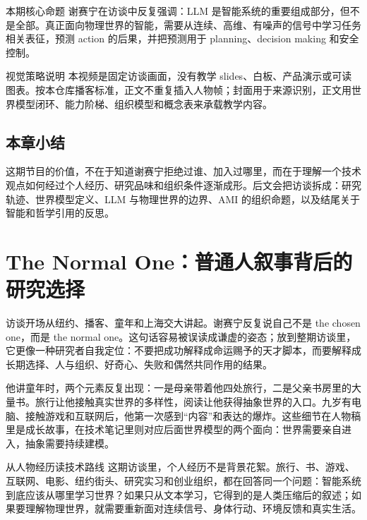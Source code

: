 \documentclass[a4paper]{article}
\begin{document}
\begin{importantbox}{本期核心命题}
谢赛宁在访谈中反复强调：LLM 是智能系统的重要组成部分，但不是全部。真正面向物理世界的智能，需要从连续、高维、有噪声的信号中学习任务相关表征，预测 action 的后果，并把预测用于 planning、decision making 和安全控制。
\end{importantbox}

\begin{knowledgebox}{视觉策略说明}
本视频是固定访谈画面，没有教学 slides、白板、产品演示或可读图表。按本仓库播客标准，正文不重复插入人物帧；封面用于来源识别，正文用世界模型闭环、能力阶梯、组织模型和概念表来承载教学内容。
\end{knowledgebox}

\subsection{本章小结}

这期节目的价值，不在于知道谢赛宁拒绝过谁、加入过哪里，而在于理解一个技术观点如何经过个人经历、研究品味和组织条件逐渐成形。后文会把访谈拆成：研究轨迹、世界模型定义、LLM 与物理世界的边界、AMI 的组织命题，以及结尾关于智能和哲学引用的反思。

\section{The Normal One：普通人叙事背后的研究选择}

访谈开场从纽约、播客、童年和上海交大讲起。谢赛宁反复说自己不是 the chosen one，而是 the normal one。这句话容易被误读成谦虚的姿态；放到整期访谈里，它更像一种研究者自我定位：不要把成功解释成命运赐予的天才脚本，而要解释成长期选择、人与组织、好奇心、失败和偶然共同作用的结果。

他讲童年时，两个元素反复出现：一是母亲带着他四处旅行，二是父亲书房里的大量书。旅行让他接触真实世界的多样性，阅读让他获得抽象世界的入口。九岁有电脑、接触游戏和互联网后，他第一次感到“内容”和表达的爆炸。这些细节在人物稿里是成长故事，在技术笔记里则对应后面世界模型的两个面向：世界需要亲自进入，抽象需要持续建模。

\begin{knowledgebox}{从人物经历读技术路线}
这期访谈里，个人经历不是背景花絮。旅行、书、游戏、互联网、电影、纽约街头、研究实习和创业组织，都在回答同一个问题：智能系统到底应该从哪里学习世界？如果只从文本学习，它得到的是人类压缩后的叙述；如果要理解物理世界，就需要重新面对连续信号、身体行动、环境反馈和真实生活。
\end{knowledgebox}
\end{document}
